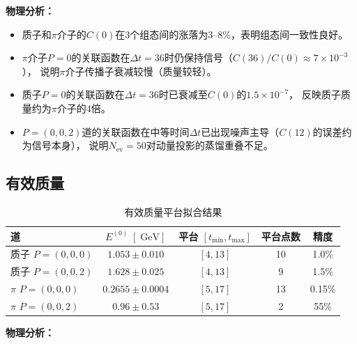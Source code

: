 \documentclass[11pt,a4paper]{article}
\newcommand{\gev}{\;\mathrm{GeV}}
\newcommand{\Nev}{N_{\mathrm{ev}}}
\begin{document}
\textbf{物理分析：}
\begin{itemize}
\item 质子和$\pi$介子的$C(0)$在3个组态间的涨落为3--8\%，表明组态间一致性良好。
\item $\pi$介子$P=0$的关联函数在$\Delta t=36$时仍保持信号（$C(36)/C(0)\approx 7\times 10^{-3}$），
说明$\pi$介子传播子衰减较慢（质量较轻）。
\item 质子$P=0$的关联函数在$\Delta t=36$时已衰减至$C(0)$的$1.5\times 10^{-7}$，
反映质子质量约为$\pi$介子的4倍。
\item $P=(0,0,2)$道的关联函数在中等时间$\Delta t$已出现噪声主导（$C(12)$的误差约为信号本身），
说明$\Nev=50$对动量投影的蒸馏重叠不足。
\end{itemize}

\subsection{有效质量}

\begin{table}[htbp]
\centering
\caption{有效质量平台拟合结果}
\label{tab:meff}
\begin{tabular}{lcccc}
\toprule
道 & $E^{(0)}\;[\gev]$ & 平台 $[t_{\min},t_{\max}]$ & 平台点数 & 精度 \\
\midrule
质子 $P=(0,0,0)$ & $1.053\pm 0.010$ & $[4,13]$ & 10 & 1.0\% \\
质子 $P=(0,0,2)$ & $1.628\pm 0.025$ & $[4,13]$ & 9 & 1.5\% \\
$\pi$ $P=(0,0,0)$ & $0.2655\pm 0.0004$ & $[5,17]$ & 13 & 0.15\% \\
$\pi$ $P=(0,0,2)$ & $0.96\pm 0.53$ & $[5,17]$ & 2 & 55\% \\
\bottomrule
\end{tabular}
\end{table}

\textbf{物理分析：}
\end{document}
